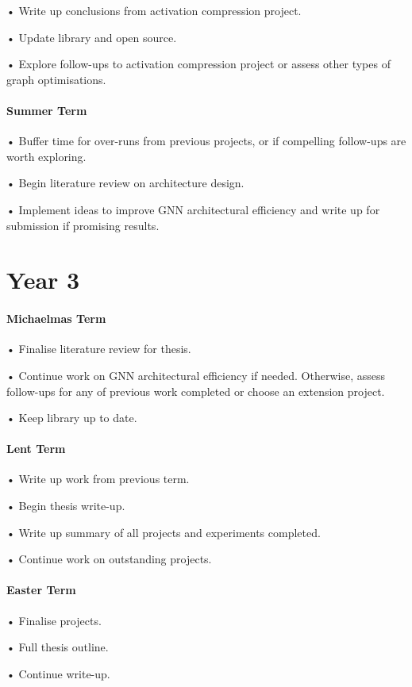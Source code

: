 \documentclass[withindex,glossary,firstyr]{cam-thesis}
\begin{document}
• Write up conclusions from activation compression project.

• Update library and open source.

• Explore follow-ups to activation compression project or assess other types of graph optimisations.

\paragraph{Summer Term}

• Buffer time for over-runs from previous projects, or if compelling follow-ups are worth exploring.

• Begin literature review on architecture design.

• Implement ideas to improve GNN architectural efficiency and write up for submission if promising results.

\section{Year 3}

\paragraph{Michaelmas Term}
• Finalise literature review for thesis.

• Continue work on GNN architectural efficiency if needed. Otherwise, assess follow-ups for any of previous work completed or choose an extension project.

• Keep library up to date.

\paragraph{Lent Term}

• Write up work from previous term.

• Begin thesis write-up.

• Write up summary of all projects and experiments completed.

• Continue work on outstanding projects.

\paragraph{Easter Term}
• Finalise projects. 

• Full thesis outline. 

• Continue write-up.
\end{document}

